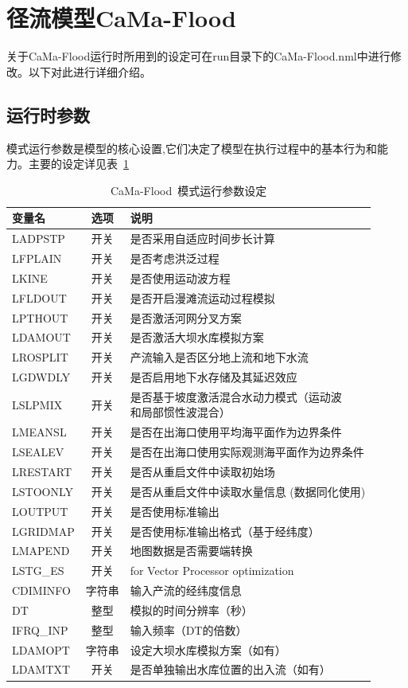 \documentclass[a4paper,12pt,twoside]{article}
\begin{document}
\section{径流模型CaMa-Flood}
关于CaMa-Flood运行时所用到的设定可在run目录下的CaMa-Flood.nml中进行修改。以下对此进行详细介绍。
\subsection{运行时参数}
模式运行参数是模型的核心设置,它们决定了模型在执行过程中的基本行为和能力。主要的设定详见表~\ref{模式运行参数设定}

\begin{table}[htbp]
\caption{CaMa-Flood~模式运行参数设定}
\centering \renewcommand{\arraystretch}{1.5}
\label{模式运行参数设定}
\begin{tabular}{lcl}
\toprule
\textbf{变量名} & \textbf{选项} & \textbf{说明} \\\midrule

LADPSTP & 开关 & 是否采用自适应时间步长计算 \\
LFPLAIN & 开关 & 是否考虑洪泛过程 \\
LKINE & 开关 & 是否使用运动波方程 \\
LFLDOUT & 开关 & 是否开启漫滩流运动过程模拟 \\
LPTHOUT & 开关 & 是否激活河网分叉方案 \\
LDAMOUT & 开关 & 是否激活大坝水库模拟方案 \\
LROSPLIT & 开关 & 产流输入是否区分地上流和地下水流 \\
LGDWDLY & 开关 & 是否启用地下水存储及其延迟效应 \\
LSLPMIX & 开关 &
\makecell[l]{是否基于坡度激活混合水动力模式（运动波\\和局部惯性波混合）} \\
LMEANSL & 开关 & 是否在出海口使用平均海平面作为边界条件 \\
LSEALEV & 开关 & 是否在出海口使用实际观测海平面作为边界条件 \\
LRESTART & 开关 & 是否从重启文件中读取初始场 \\
LSTOONLY & 开关 & 是否从重启文件中读取水量信息 (数据同化使用) \\
LOUTPUT & 开关 & 是否使用标准输出 \\
LGRIDMAP & 开关 & 是否使用标准输出格式（基于经纬度） \\
LMAPEND & 开关 & 地图数据是否需要端转换 \\
LSTG\_ES & 开关 & for Vector Processor optimization \\
CDIMINFO & 字符串 & 输入产流的经纬度信息 \\
DT & 整型 & 模拟的时间分辨率（秒） \\
IFRQ\_INP & 整型 & 输入频率（DT的倍数） \\
LDAMOPT & 字符串 & 设定大坝水库模拟方案（如有） \\
LDAMTXT & 开关 & 是否单独输出水库位置的出入流（如有） \\
\bottomrule
\end{tabular}
\end{table}
\end{document}
